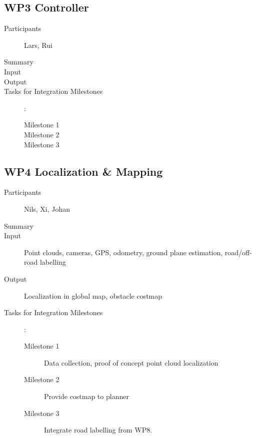 \documentclass[11pt,a4paper]{article}
\begin{document}
\subsection{WP3 Controller}

\begin{description}
\item[Participants] Lars, Rui
\item[Summary]
\item[Input]
\item[Output]
\item[Tasks for Integration Milestones]:\
	\begin{description}
		\item[Milestone 1]
		\item[Milestone 2]
		\item[Milestone 3] 
	\end{description}	 
\end{description}

\subsection{WP4 Localization \& Mapping}

\begin{description}
\item[Participants] Nils, Xi, Johan
\item[Summary]
\item[Input] Point clouds, cameras, GPS, odometry, ground plane estimation, road/off-road labelling
\item[Output] Localization in global map, obstacle costmap
\item[Tasks for Integration Milestones]:\
	\begin{description}
		\item[Milestone 1] Data collection, proof of concept point cloud localization
		\item[Milestone 2] Provide costmap to planner
		\item[Milestone 3] Integrate road labelling from WP8.
	\end{description}	 
\end{description}
\end{document}
